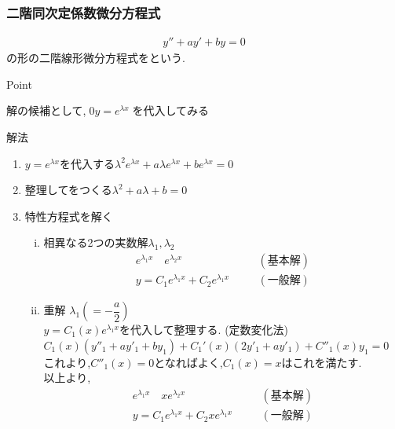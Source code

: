 \documentclass[a4paper]{jsarticle}
\begin{document}
\subsubsection{二階同次定係数微分方程式}
\begin{eqnarray*}
    y''+ay'+by=0
\end{eqnarray*}
の形の二階線形微分方程式をという.
\begin{itembox}[l]{Point}
    \begin{center}
        解の候補として,$\;0y=e^{\lambda x}\;$を代入してみる
    \end{center}
\end{itembox}
\begin{itembox}[l]{解法}
    \begin{enumerate}[(1)]
        \item $y=e^{\lambda x}$を代入する\quad$\lambda^2 e^{\lambda x}+a\lambda e^{\lambda x}+b e^{\lambda x}=0$
        \item 整理してをつくる\quad$\lambda^2+a\lambda+b=0$
        \item 特性方程式を解く
              \begin{enumerate}[(i)]
                  \item 相異なる2つの実数解$\lambda_1,\lambda_2$
                        \begin{eqnarray*}
                            e^{\lambda_1x}\quad e^{\lambda_2x}\quad &&(基本解)\\
                            y=C_1 e^{\lambda_1x}+C_2e^{\lambda_1x}\quad &&(一般解)
                        \end{eqnarray*}
                  \item 重解 $\lambda_1\left(=-\dfrac{a}{2}\right)$\\
                        $y=C_1\left(x\right) e^{\lambda_1x}$を代入して整理する. (定数変化法)\\
                        $C_1\left(x\right)\left(y''_1+ay'_1+by_1\right)+C_1'\left(x\right)\left(2y'_1+ay'_1\right)+C''_1\left(x\right)y_1=0$\\
                        これより,$C''_1\left(x\right)=0$となればよく,$C_1\left(x\right)=x$はこれを満たす.\\
                        以上より,
                        \begin{eqnarray*}
                            e^{\lambda_1x}\quad xe^{\lambda_2x}\quad &&(基本解)\\
                            y=C_1 e^{\lambda_1x}+C_2xe^{\lambda_1x}\quad &&(一般解)

\end{eqnarray*}
\end{enumerate}
\end{enumerate}
\end{itembox}
\end{document}
